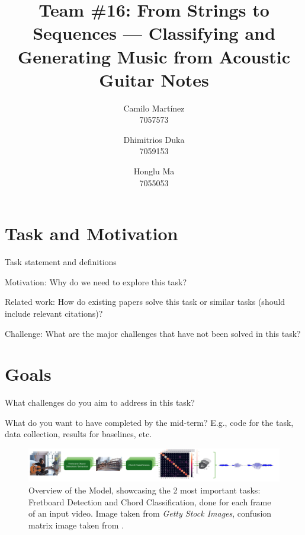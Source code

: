 \documentclass[10pt,twocolumn,letterpaper]{article}
\begin{document}
\title{Team \#16: From Strings to Sequences --- Classifying and Generating Music from Acoustic Guitar Notes}

\author{
Camilo Martínez\\
7057573\\
\and
Dhimitrios Duka\\
7059153\\
\and
Honglu Ma\\
7055053\\
}
\maketitle

\section{Task and Motivation}

Task statement and definitions

Motivation: Why do we need to explore this task?

Related work: How do existing papers solve this task or similar tasks (should include relevant citations)?

Challenge: What are the major challenges that have not been solved in this task?

\cite{Kristian_Zaman_Tenoyo_Jodhinata_2024}
\cite{du2023conditional}

\section{Goals}

What challenges do you aim to address in this task?

What do you want to have completed by the mid-term? E.g., code for the task, data collection, results for baselines, etc.


\begin{figure}[h]\label{fig:diagram}
    \centering
    \includegraphics[width=\textwidth]{images/task-diagram.pdf}
    \caption{Overview of the Model, showcasing the 2 most important tasks: 
    Fretboard Detection and Chord Classification, done for each frame of an input video. Image taken from \textit{Getty Stock Images}, confusion matrix image taken from \cite{Kristian_Zaman_Tenoyo_Jodhinata_2024}.}
    \label{fig:figure1}
\end{figure}
\end{document}
